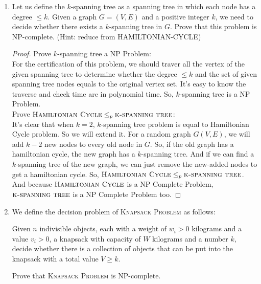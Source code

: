\documentclass[12pt,a4paper]{article}
\theoremstyle{definition}
\begin{document}
\begin{enumerate}
    \item Let us define the $k$-spanning tree as a spanning tree in which each node has a degree $\leqslant k$. Given a graph $G= (V,E)$ and a positive integer $k$, we need to decide whether there exists a $k$-spanning tree in $G$. Prove that this problem is NP-complete. (Hint: reduce from \textsc{HAMILTONIAN-CYCLE})
    
    \begin{proof}
        Prove $k$-spanning tree a NP Problem:\\
        For the certification of this problem, we should traver all the vertex of the given spanning tree to determine whether the degree $\leq k$ and the set of given spanning tree nodes equals to the original vertex set. It's easy to know the traverse and check time are in polynomial time. So, $k$-spanning tree is a NP Problem.\\
        Prove $\textsc{Hamiltonian Cycle}\leq_p\textsc{k-spanning tree}$:\\
        It's clear that when $k=2$, $k$-spanning tree problem is equal to Hamiltonian Cycle problem. So we will extend it. For a random graph $G(V,E)$, we will add $k-2$ new nodes to every old node in $G$. So, if the old graph has a hamiltonian cycle, the new graph has a $k$-spanning tree. And if we can find a $k$-spanning tree of the new graph, we can just remove the new-added nodes to get a hamiltonian cycle.
        So, $\textsc{Hamiltonian Cycle}\leq_p\textsc{k-spanning tree}$. And because $\textsc{Hamiltonian Cycle}$ is a NP Complete Problem, $\textsc{k-spanning tree}$ is a NP Complete Problem too.
    \end{proof}
    
    \item We define the decision problem of \textsc{Knapsack Problem} as follows:
    
        Given $n$ indivisible objects, each with a weight of $w_i>0$ kilograms and a value $v_i>0$, a knapsack with capacity of $W$ kilograms and a number $k$, decide whether there is a collection of objects that can be put into the knapsack with a total value $V\geqslant k$.
        
    Prove that \textsc{Knapsack Problem} is NP-complete.


\end{enumerate}
\end{document}
